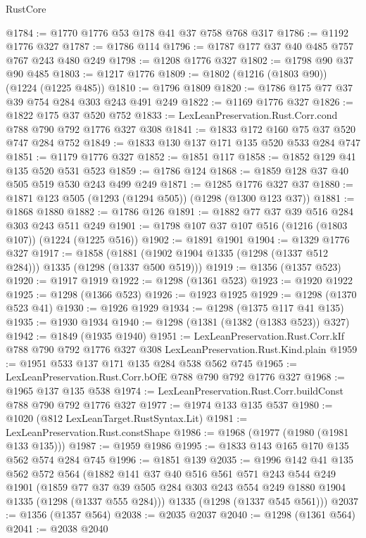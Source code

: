 \begin{lexlean}{RustCore}
\begin{coremodule}
@1784 := @1770 @1776 @53 @178 @41 @37 @758 @768 @317
@1786 := @1192 @1776 @327
@1787 := @1786 @114
@1796 := @1787 @177 @37 @40 @485 @757 @767 @243 @480 @249
@1798 := @1208 @1776 @327
@1802 := @1798 @90 @37 @90 @485
@1803 := @1217 @1776
@1809 := @1802 (@1216 (@1803 @90)) (@1224 (@1225 @485))
@1810 := @1796 @1809
@1820 := @1786 @175 @77 @37 @39 @754 @284 @303 @243 @491 @249
@1822 := @1169 @1776 @327
@1826 := @1822 @175 @37 @520 @752
@1833 := LexLeanPreservation.Rust.Corr.cond @788 @790 @792 @1776 @327 @308
@1841 := @1833 @172 @160 @75 @37 @520 @747 @284 @752
@1849 := @1833 @130 @137 @171 @135 @520 @533 @284 @747
@1851 := @1179 @1776 @327
@1852 := @1851 @117
@1858 := @1852 @129 @41 @135 @520 @531 @523
@1859 := @1786 @124
@1868 := @1859 @128 @37 @40 @505 @519 @530 @243 @499 @249
@1871 := @1285 @1776 @327 @37
@1880 := @1871 @123 @505 (@1293 (@1294 @505)) (@1298 (@1300 @123 @37))
@1881 := @1868 @1880
@1882 := @1786 @126
@1891 := @1882 @77 @37 @39 @516 @284 @303 @243 @511 @249
@1901 := @1798 @107 @37 @107 @516 (@1216 (@1803 @107)) (@1224 (@1225 @516))
@1902 := @1891 @1901
@1904 := @1329 @1776 @327
@1917 := @1858 (@1881 (@1902 @1904 @1335 (@1298 (@1337 @512 @284))) @1335 (@1298 (@1337 @500 @519)))
@1919 := @1356 (@1357 @523)
@1920 := @1917 @1919
@1922 := @1298 (@1361 @523)
@1923 := @1920 @1922
@1925 := @1298 (@1366 @523)
@1926 := @1923 @1925
@1929 := @1298 (@1370 @523 @41)
@1930 := @1926 @1929
@1934 := @1298 (@1375 @117 @41 @135)
@1935 := @1930 @1934
@1940 := @1298 (@1381 (@1382 (@1383 @523)) @327)
@1942 := @1849 (@1935 @1940)
@1951 := LexLeanPreservation.Rust.Corr.kIf
    @788
    @790
    @792
    @1776
    @327
    @308
    LexLeanPreservation.Rust.Kind.plain
@1959 := @1951 @533 @137 @171 @135 @284 @538 @562 @745
@1965 := LexLeanPreservation.Rust.Corr.bOfE @788 @790 @792 @1776 @327
@1968 := @1965 @137 @135 @538
@1974 := LexLeanPreservation.Rust.Corr.buildConst @788 @790 @792 @1776 @327
@1977 := @1974 @133 @135 @537
@1980 := @1020 (@812 LexLeanTarget.RustSyntax.Lit)
@1981 := LexLeanPreservation.Rust.constShape
@1986 := @1968 (@1977 (@1980 (@1981 @133 @135)))
@1987 := @1959 @1986
@1995 := @1833 @143 @165 @170 @135 @562 @574 @284 @745
@1996 := @1851 @139
@2035 := @1996
    @142
    @41
    @135
    @562
    @572
    @564
    (@1882
      @141
      @37
      @40
      @516
      @561
      @571
      @243
      @544
      @249
      @1901
      (@1859 @77 @37 @39 @505 @284 @303 @243 @554 @249 @1880 @1904 @1335 (@1298 (@1337 @555 @284)))
      @1335
      (@1298 (@1337 @545 @561)))
@2037 := @1356 (@1357 @564)
@2038 := @2035 @2037
@2040 := @1298 (@1361 @564)
@2041 := @2038 @2040

\end{coremodule}
\end{lexlean}

